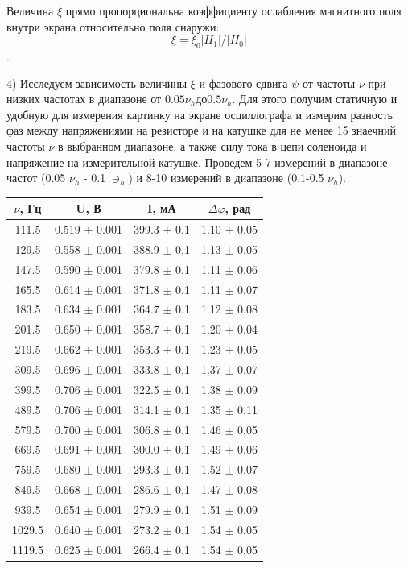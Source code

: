 \documentclass[a4paper,12pt]{article}
\begin{document}
Величина $\xi$ прямо пропорциональна коэффициенту ослабления магнитного поля внутри экрана относительно поля снаружи: \\

$$ \xi = \xi_0|H_1|/|H_0| $$. 

\par4) Исследуем зависимость величины $\xi$ и фазового сдвига $\psi$ от частоты $\nu$ при низких частотах в диапазоне от $0.05 \nu_h до 0.5 \nu_h$. Для этого получим статичную и удобную для измерения картинку на экране осциллографа и измерим разность фаз между напряжениями на резисторе и на катушке для не менее 15 знаечний частоты $\nu$ в выбранном диапазоне, а также силу тока в цепи соленоида и напряжение на измерительной катушке. Проведем 5-7 измерений в диапазоне частот  (0.05 $\nu_h$ - 0.1 $\ni_h$) и 8-10 измерений в диапазоне (0.1-0.5 $\nu_h$).

\begin{center}
\begin{tabular}{|c|c|c|c|}
	\hline
	$\nu$, Гц & U, В & I, мА & $\Delta\varphi$, рад \\
	\hline
	111.5 & 0.519 $\pm$ 0.001 & 399.3 $\pm$ 0.1 & 1.10 $\pm$ 0.05 \\
	\hline
	129.5 & 0.558 $\pm$ 0.001 & 388.9 $\pm$ 0.1 & 1.13 $\pm$ 0.05 \\
	\hline 
	147.5 & 0.590 $\pm$ 0.001 & 379.8 $\pm$ 0.1 & 1.11 $\pm$ 0.06 \\
	\hline
	165.5 & 0.614 $\pm$ 0.001 & 371.8 $\pm$ 0.1 & 1.11 $\pm$ 0.07 \\
	\hline
	183.5 & 0.634 $\pm$ 0.001 & 364.7 $\pm$ 0.1 & 1.12 $\pm$ 0.08 \\
	\hline
	201.5 & 0.650 $\pm$ 0.001 & 358.7 $\pm$ 0.1 & 1.20 $\pm$ 0.04 \\
	\hline
	219.5 & 0.662 $\pm$ 0.001 & 353.3 $\pm$ 0.1 & 1.23 $\pm$ 0.05 \\
	\hline
	309.5 & 0.696 $\pm$ 0.001 & 333.8 $\pm$ 0.1 & 1.37 $\pm$ 0.07 \\
	\hline
	399.5 & 0.706 $\pm$ 0.001 & 322.5 $\pm$ 0.1 & 1.38 $\pm$ 0.09 \\
	\hline
	489.5 & 0.706 $\pm$ 0.001 & 314.1 $\pm$ 0.1 & 1.35 $\pm$ 0.11 \\
	\hline
	579.5 & 0.700 $\pm$ 0.001 & 306.8 $\pm$ 0.1 & 1.46 $\pm$ 0.05 \\
	\hline
	669.5 & 0.691 $\pm$ 0.001 & 300.0 $\pm$ 0.1 & 1.49 $\pm$ 0.06 \\
	\hline
	759.5 & 0.680 $\pm$ 0.001 & 293.3 $\pm$ 0.1 & 1.52 $\pm$ 0.07 \\
	\hline
	849.5 & 0.668 $\pm$ 0.001 & 286.6 $\pm$ 0.1 & 1.47 $\pm$ 0.08 \\
	\hline
	939.5 & 0.654 $\pm$ 0.001 & 279.9 $\pm$ 0.1 & 1.51 $\pm$ 0.09 \\
	\hline
	1029.5 & 0.640 $\pm$ 0.001 & 273.2 $\pm$ 0.1 & 1.54 $\pm$ 0.05 \\
	\hline
	1119.5 & 0.625 $\pm$ 0.001 & 266.4 $\pm$ 0.1 & 1.54 $\pm$ 0.05 \\
	\hline
\end{tabular}
\end{center}
\end{document}
